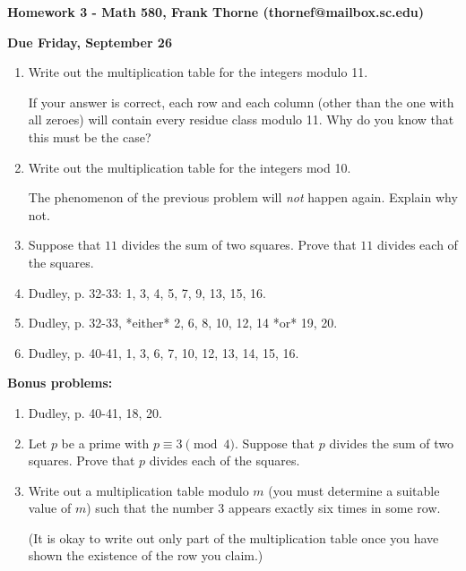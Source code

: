 \documentclass[12pt]{article}
\begin{document}
\setlength{\topmargin}{-2mm}





\begin{center}{\bf Homework 3 - Math 580, Frank Thorne (thornef@mailbox.sc.edu)}
\end{center}
\begin{center}
{\bf Due Friday, September 26}
\end{center}
\begin{enumerate}[(1)]
\item 
Write out the multiplication table for the integers modulo 11.

If your answer is correct, each row and each column (other than the one with all zeroes)
will contain every residue class modulo 11. Why do you know that this must be the case?
\item
Write out the multiplication table for the integers mod 10.

The phenomenon of the previous problem will {\itshape not} happen again. Explain why not.
\item
Suppose that $11$ divides the sum of two squares. Prove that $11$ divides each of the squares.
\item
Dudley, p. 32-33: 1, 3, 4, 5, 7, 9, 13, 15, 16.
\item
Dudley, p. 32-33, *either* 2, 6, 8, 10, 12, 14 *or* 19, 20.
\item
Dudley, p. 40-41, 1, 3, 6, 7, 10, 12, 13, 14, 15, 16.
\end{enumerate}
{\bf Bonus problems:}
\begin{enumerate}[(1)]
\item
Dudley, p. 40-41, 18, 20.
\item
Let $p$ be a prime with $p \equiv 3 \pmod 4$. Suppose that $p$ divides the sum of two squares.
Prove that $p$ divides each of the squares.
\item
Write out a multiplication table modulo $m$ (you must determine a suitable value of $m$)
such that the number $3$ appears exactly six times in some row.

(It is okay to write out only part of the multiplication table once you have shown the existence
of the row you claim.)
\end{enumerate}
\end{document}
